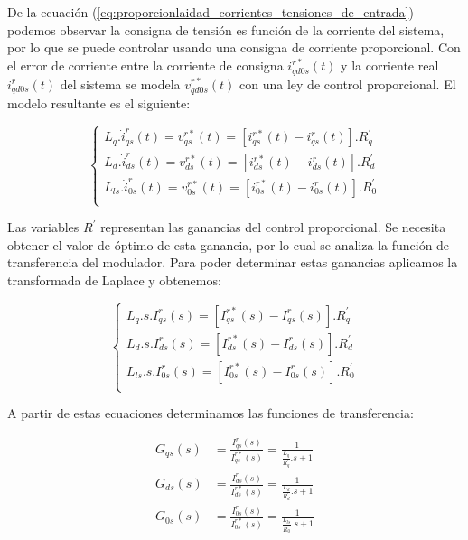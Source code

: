 \documentclass{article}
\begin{document}
De la ecuación (\ref{eq:proporcionlaidad_corrientes_tensiones_de_entrada}) podemos observar 
la consigna de tensión es función de la corriente del sistema, por lo que se puede controlar usando 
una consigna de corriente proporcional. Con el error de corriente entre la corriente de consigna 
$i_{qd0s}^{r*}(t)$ y la corriente real $i_{qd0s}^{r}(t)$ del sistema se modela $v_{qd0s}^{r*}(t)$ 
con una ley de control proporcional. El modelo resultante es el siguiente:

\begin{equation}
    \begin{cases}
        L_q. \dot{i}_{qs}^r(t) = v^{r*}_{qs}(t) = [i_{qs}^{r*}(t) - i_{qs}^r(t)].R_q^\prime \\
        L_d. \dot{i}_{ds}^r(t) = v^{r*}_{ds}(t) = [i_{ds}^{r*}(t) - i_{ds}^r(t)].R_d^\prime \\
        L_{ls}. \dot{i}_{0s}^r(t) = v^{r*}_{0s}(t) = [i_{0s}^{r*}(t) - i_{0s}^r(t)].R_{0}^\prime \\
    \end{cases}
\end{equation}

Las variables $R^\prime$ representan las ganancias del control proporcional. Se necesita obtener 
el valor de óptimo de esta ganancia, por lo cual se analiza la función de transferencia del modulador.
Para poder determinar estas ganancias aplicamos la transformada de Laplace y obtenemos:

\begin{equation}
    \begin{cases}
        L_q. s.I_{qs}^r(s) = [I_{qs}^{r*}(s) - I_{qs}^r(s)].R_q^\prime \\
        L_d. s.I_{ds}^r(s) = [I_{ds}^{r*}(s) - I_{ds}^r(s)].R_d^\prime \\
        L_{ls}. s.I_{0s}^r(s) = [I_{0s}^{r*}(s) - I_{0s}^r(s)].R_{0}^\prime \\
    \end{cases}
\end{equation}

A partir de estas ecuaciones determinamos las funciones de transferencia:

\begin{align*}
    G_{qs}(s) &= \frac{I_{qs}^r(s)}{I_{qs}^{r*}(s)} = \frac{1}{\frac{L_q}{R_q^\prime}.s + 1}  \\
    G_{ds}(s) &= \frac{I_{ds}^r(s)}{I_{ds}^{r*}(s)} = \frac{1}{\frac{L_d}{R_d^\prime}.s + 1}  \\
    G_{0s}(s) &= \frac{I_{0s}^r(s)}{I_{0s}^{r*}(s)} = \frac{1}{\frac{L_{ls}}{R_{0}^\prime}.s + 1}
\end{align*}
\end{document}
